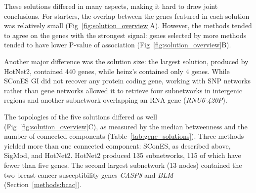 \documentclass[10pt,letterpaper]{article}
\begin{document}
These solutions differed in many aspects, making it hard to draw joint conclusions. For starters, the overlap between the genes featured in each solution was relatively small (Fig~\ref{fig:solution_overview}A). However, the methods tended to agree on the genes with the strongest signal: genes selected by more methods tended to have lower P-value of association (Fig~\ref{fig:solution_overview}B).

Another major difference was the solution size: the largest solution, produced by HotNet2, contained 440 genes, while heinz's contained only 4 genes. While SConES GI did not recover any protein coding gene, working with SNP networks rather than gene networks allowed it to retrieve four subnetworks in intergenic regions and another subnetwork overlapping an RNA gene (\emph{RNU6-420P}).

The topologies of the five solutions differed as well (Fig~\ref{fig:solution_overview}C), as measured by the median betweenness and the number of connected components (Table~\ref{tab:gene_solutions}). Three methods yielded more than one connected component: SConES, as described above, SigMod, and HotNet2. HotNet2 produced 135 subnetworks, 115 of which have fewer than five genes. The second largest subnetwork (13 nodes) contained the two breast cancer susceptibility genes \emph{CASP8} and \emph{BLM} (Section~\ref{methods:bcac}).
\end{document}
